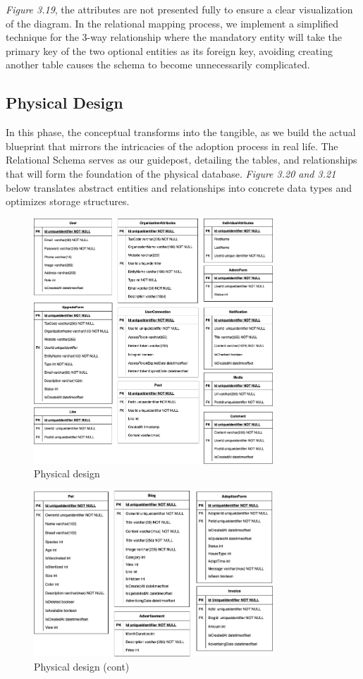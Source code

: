 \emph{Figure 3.19}, the attributes are not presented fully to ensure a clear visualization of the diagram. In the relational mapping process, we implement a simplified technique for the 3-way relationship where the mandatory entity will take the primary key of the two optional entities as its foreign key, avoiding creating another table causes the schema to become unnecessarily complicated.

\subsection{Physical Design}

In this phase, the conceptual transforms into the tangible, as we build the actual blueprint that mirrors the intricacies of the adoption process in real life. The Relational Schema serves as our guidepost, detailing the tables, and relationships that will form the foundation of the physical database. \textit{Figure 3.20 and 3.21} below translates abstract entities and relationships into concrete data types and optimizes storage structures.

\begin {figure}[H]
\centering
\includegraphics[width=0.8\textwidth]{Figures/DatabaseDesign/Entities-Physical_1.png}
\caption{Physical design}
\end{figure}

\begin {figure}[H]
\centering
\includegraphics[width=0.8\textwidth]{Figures/DatabaseDesign/Entities-Physical_2.png}
\caption{Physical design (cont)}
\end{figure}




